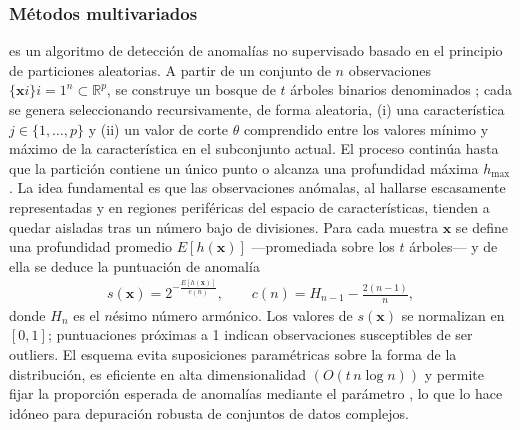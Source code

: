 \documentclass[a4paper,10pt,spanish]{jupyterBook}
\begin{document}
\subsubsection{Métodos multivariados}
\label{\detokenize{content/03/Analisis:metodos-multivariados}}
\sphinxAtStartPar
{} es un algoritmo de detección de anomalías no supervisado basado en el principio de particiones aleatorias. A partir de un conjunto de \(n\) observaciones \(\{\mathbf{x}{i}\}{i=1}^{n}\subset\mathbb{R}^{p}\), se construye un bosque de \(t\) árboles binarios denominados ; cada  se genera seleccionando recursivamente, de forma aleatoria, (i) una característica \(j\in\{1,\dots,p\}\) y (ii) un valor de corte \(\theta\) comprendido entre los valores mínimo y máximo de la característica en el subconjunto actual. El proceso continúa hasta que la partición contiene un único punto o alcanza una profundidad máxima \(h_{\max}\). La idea fundamental es que las observaciones anómalas, al hallarse escasamente representadas y en regiones periféricas del espacio de características, tienden a quedar aisladas tras un número bajo de divisiones. Para cada muestra \(\mathbf{x}\) se define una profundidad promedio \(E[h(\mathbf{x})]\) —promediada sobre los \(t\) árboles— y de ella se deduce la puntuación de anomalía
\begin{equation}\label{equation:content/03/Analisis:eq_iforest_1}
\begin{split}s(\mathbf{x}) = 2^{-\frac{E[h(\mathbf{x})]}{c(n)}},
\qquad
c(n) = H_{n-1}-\frac{2(n-1)}{n},\end{split}
\end{equation}
\sphinxAtStartPar
donde \(H_{n}\) es el \(n\)\sphinxhyphen{}ésimo número armónico. Los valores de \(s(\mathbf{x})\) se normalizan en \([0,1]\); puntuaciones próximas a 1 indican observaciones susceptibles de ser outliers. El esquema evita suposiciones paramétricas sobre la forma de la distribución, es eficiente en alta dimensionalidad \((O(t\,n\log n))\) y permite fijar  la proporción esperada de anomalías mediante el parámetro , lo que lo hace idóneo para depuración robusta de conjuntos de datos complejos.
\end{document}
